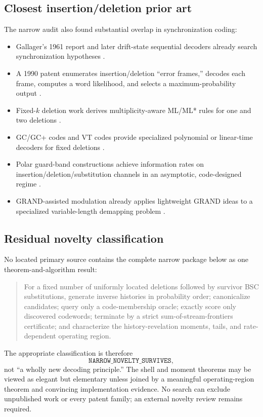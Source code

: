 \documentclass[11pt]{article}
\theoremstyle{definition}
\theoremstyle{remark}
\begin{document}
\subsection{Closest insertion/deletion prior art}
The narrow audit also found substantial overlap in synchronization coding:
\begin{itemize}[leftmargin=2em]
\item Gallager's 1961 report and later drift-state sequential decoders already search synchronization hypotheses \cite{Gallager1961,Banerjee2022}.
\item A 1990 patent enumerates insertion/deletion ``error frames,'' decodes each frame, computes a word likelihood, and selects a maximum-probability output \cite{US4922494}.
\item Fixed-$k$ deletion work derives multiplicity-aware ML/ML* rules for one and two deletions \cite{Sabary2022}.
\item GC/GC+ codes and VT codes provide specialized polynomial or linear-time decoders for fixed deletions \cite{Hanna2017,Abroshan2017}.
\item Polar guard-band constructions achieve information rates on insertion/deletion/substitution channels in an asymptotic, code-designed regime \cite{PfisterTal2021}.
\item GRAND-assisted modulation already applies lightweight GRAND ideas to a specialized variable-length demapping problem \cite{Ozaydin2022}.
\end{itemize}

\subsection{Residual novelty classification}
No located primary source contains the complete narrow package below as one theorem-and-algorithm result:
\begin{quote}
For a fixed number of uniformly located deletions followed by survivor BSC substitutions, generate inverse histories in probability order; canonicalize candidates; query only a code-membership oracle; exactly score only discovered codewords; terminate by a strict sum-of-stream-frontiers certificate; and characterize the history-revelation moments, tails, and rate-dependent operating region.
\end{quote}
The appropriate classification is therefore
\[
\boxed{\texttt{NARROW\_NOVELTY\_SURVIVES},}
\]
not ``a wholly new decoding principle.''  The shell and moment theorems may be viewed as elegant but elementary unless joined by a meaningful operating-region theorem and convincing implementation evidence.  No search can exclude unpublished work or every patent family; an external novelty review remains required.
\end{document}
